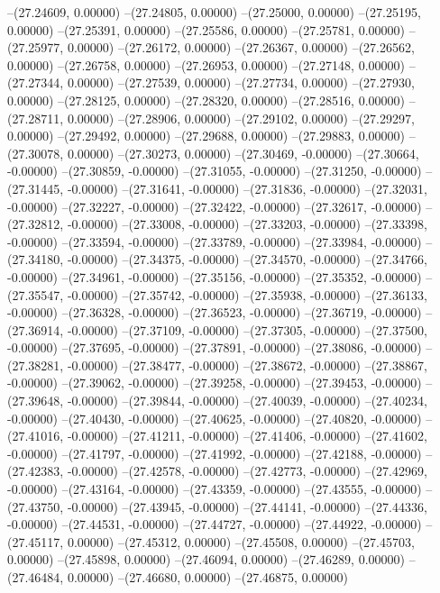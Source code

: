 --(27.24609, 0.00000)
--(27.24805, 0.00000)
--(27.25000, 0.00000)
--(27.25195, 0.00000)
--(27.25391, 0.00000)
--(27.25586, 0.00000)
--(27.25781, 0.00000)
--(27.25977, 0.00000)
--(27.26172, 0.00000)
--(27.26367, 0.00000)
--(27.26562, 0.00000)
--(27.26758, 0.00000)
--(27.26953, 0.00000)
--(27.27148, 0.00000)
--(27.27344, 0.00000)
--(27.27539, 0.00000)
--(27.27734, 0.00000)
--(27.27930, 0.00000)
--(27.28125, 0.00000)
--(27.28320, 0.00000)
--(27.28516, 0.00000)
--(27.28711, 0.00000)
--(27.28906, 0.00000)
--(27.29102, 0.00000)
--(27.29297, 0.00000)
--(27.29492, 0.00000)
--(27.29688, 0.00000)
--(27.29883, 0.00000)
--(27.30078, 0.00000)
--(27.30273, 0.00000)
--(27.30469, -0.00000)
--(27.30664, -0.00000)
--(27.30859, -0.00000)
--(27.31055, -0.00000)
--(27.31250, -0.00000)
--(27.31445, -0.00000)
--(27.31641, -0.00000)
--(27.31836, -0.00000)
--(27.32031, -0.00000)
--(27.32227, -0.00000)
--(27.32422, -0.00000)
--(27.32617, -0.00000)
--(27.32812, -0.00000)
--(27.33008, -0.00000)
--(27.33203, -0.00000)
--(27.33398, -0.00000)
--(27.33594, -0.00000)
--(27.33789, -0.00000)
--(27.33984, -0.00000)
--(27.34180, -0.00000)
--(27.34375, -0.00000)
--(27.34570, -0.00000)
--(27.34766, -0.00000)
--(27.34961, -0.00000)
--(27.35156, -0.00000)
--(27.35352, -0.00000)
--(27.35547, -0.00000)
--(27.35742, -0.00000)
--(27.35938, -0.00000)
--(27.36133, -0.00000)
--(27.36328, -0.00000)
--(27.36523, -0.00000)
--(27.36719, -0.00000)
--(27.36914, -0.00000)
--(27.37109, -0.00000)
--(27.37305, -0.00000)
--(27.37500, -0.00000)
--(27.37695, -0.00000)
--(27.37891, -0.00000)
--(27.38086, -0.00000)
--(27.38281, -0.00000)
--(27.38477, -0.00000)
--(27.38672, -0.00000)
--(27.38867, -0.00000)
--(27.39062, -0.00000)
--(27.39258, -0.00000)
--(27.39453, -0.00000)
--(27.39648, -0.00000)
--(27.39844, -0.00000)
--(27.40039, -0.00000)
--(27.40234, -0.00000)
--(27.40430, -0.00000)
--(27.40625, -0.00000)
--(27.40820, -0.00000)
--(27.41016, -0.00000)
--(27.41211, -0.00000)
--(27.41406, -0.00000)
--(27.41602, -0.00000)
--(27.41797, -0.00000)
--(27.41992, -0.00000)
--(27.42188, -0.00000)
--(27.42383, -0.00000)
--(27.42578, -0.00000)
--(27.42773, -0.00000)
--(27.42969, -0.00000)
--(27.43164, -0.00000)
--(27.43359, -0.00000)
--(27.43555, -0.00000)
--(27.43750, -0.00000)
--(27.43945, -0.00000)
--(27.44141, -0.00000)
--(27.44336, -0.00000)
--(27.44531, -0.00000)
--(27.44727, -0.00000)
--(27.44922, -0.00000)
--(27.45117, 0.00000)
--(27.45312, 0.00000)
--(27.45508, 0.00000)
--(27.45703, 0.00000)
--(27.45898, 0.00000)
--(27.46094, 0.00000)
--(27.46289, 0.00000)
--(27.46484, 0.00000)
--(27.46680, 0.00000)
--(27.46875, 0.00000)
